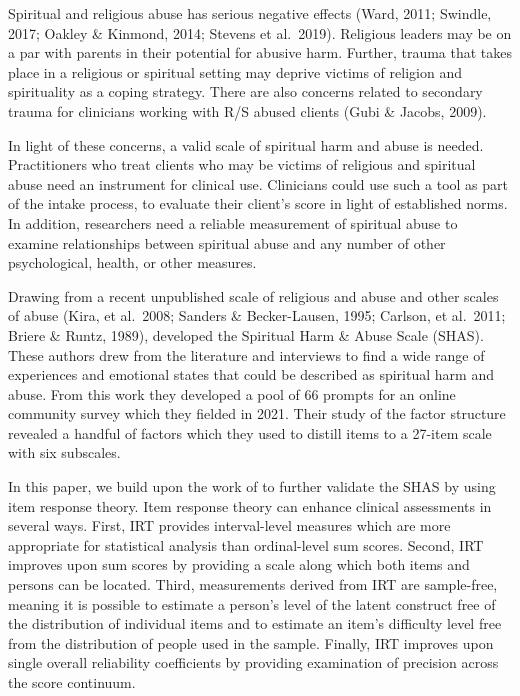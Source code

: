 \documentclass[
]{article}
\begin{document}
Spiritual and religious abuse has serious negative effects (Ward, 2011; Swindle, 2017; Oakley \& Kinmond, 2014; Stevens et al.~2019). Religious leaders may be on a par with parents in their potential for abusive harm. Further, trauma that takes place in a religious or spiritual setting may deprive victims of religion and spirituality as a coping strategy. There are also concerns related to secondary trauma for clinicians working with R/S abused clients (Gubi \& Jacobs, 2009).

In light of these concerns, a valid scale of spiritual harm and abuse is needed. Practitioners who treat clients who may be victims of religious and spiritual abuse need an instrument for clinical use. Clinicians could use such a tool as part of the intake process, to evaluate their client's score in light of established norms. In addition, researchers need a reliable measurement of spiritual abuse to examine relationships between spiritual abuse and any number of other psychological, health, or other measures.

Drawing from a recent unpublished scale of religious and abuse \citep{Keller2016} and other scales of abuse (Kira, et al.~2008; Sanders \& Becker-Lausen, 1995; Carlson, et al.~2011; Briere \& Runtz, 1989), \citet{KochEdstrom2022} developed the Spiritual Harm \& Abuse Scale (SHAS). These authors drew from the literature and interviews to find a wide range of experiences and emotional states that could be described as spiritual harm and abuse. From this work they developed a pool of 66 prompts for an online community survey which they fielded in 2021. Their study of the factor structure revealed a handful of factors which they used to distill items to a 27-item scale with six subscales.

In this paper, we build upon the work of \citet{KochEdstrom2022} to further validate the SHAS by using item response theory. Item response theory can enhance clinical assessments in several ways. First, IRT provides interval-level measures which are more appropriate for statistical analysis than ordinal-level sum scores. Second, IRT improves upon sum scores by providing a scale along which both items and persons can be located. Third, measurements derived from IRT are sample-free, meaning it is possible to estimate a person's level of the latent construct free of the distribution of individual items and to estimate an item's difficulty level free from the distribution of people used in the sample. Finally, IRT improves upon single overall reliability coefficients by providing examination of precision across the score continuum.
\end{document}
